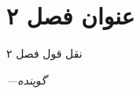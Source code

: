 \chapter{عنوان فصل ۲}
\setlength{\epigraphwidth}{0.4\textwidth} 
\epigraph{نقل قول فصل ۲}{\textit{—گوینده}}
\setcounter{footnote}{0}
